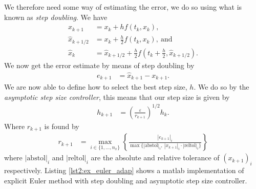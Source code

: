 We therefore need some way of estimating the error, we do so using what is known as \textit{step doubling}. We have
\begin{align}
    x_{k+1} &= x_k + hf(t_k,x_k), \\
    \hat{x}_{k+1/2} &= x_k + \frac{h}{2}f(t_k,x_k), \ \text{and} \\
    \hat{x}_{k} &= \hat{x}_{k+1/2} + \frac{h}{2}f(t_k+\frac{h}{2},\hat{x}_{k+1/2}).
\end{align}
We now get the error estimate by means of step doubling by
\begin{align}
    e_{k+1} &= \hat{x}_{k+1} - x_{k+1}.
\end{align}
We are now able to define how to select the best step size, $h$. We do so by the \textit{asymptotic step size controller}, this means that our step size is given by
\begin{align}
    h_{k+1} &= \left(\frac{\varepsilon}{r_{k+1}} \right )^{1/2} h_k.
\end{align}
Where $r_{k+1}$ is found by
\begin{align}
    r_{k+1} &= \max_{i \in \{1,...,n_x\}} \left \{ \frac{|e_{k+1}|_i}{ \max \{ |\text{abstol}|_i, \ |x_{k+1}|_i \cdot |\text{reltol}|_i \} } \right \}
\end{align}
where $|\text{abstol}|_i$ and $|\text{reltol}|_i$ are the absolute and relative tolerance of $(x_{k+1})_i$ respectively. Listing \ref{lst2:ex_euler_adap} shows a matlab implementation of explicit Euler method with step doubling and asymptotic step size controller. 

